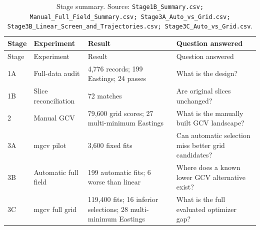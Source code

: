 \begin{longtable}{@{}p{1.2cm}p{3.1cm}p{4.2cm}p{5.8cm}@{}}
\caption{Stage summary. Source: \texttt{Stage1B\_Summary.csv; Manual\_Full\_Field\_Summary.csv; Stage3A\_Auto\_vs\_Grid.csv; Stage3B\_Linear\_Screen\_and\_Trajectories.csv; Stage3C\_Auto\_vs\_Grid.csv}.}\label{tab:stage-summary}\\
\toprule
Stage & Experiment & Result & Question answered\\
\midrule
\endfirsthead
\toprule
Stage & Experiment & Result & Question answered\\
\midrule
\endhead
1A & Full-data audit & 4,776 records; 199 Eastings; 24 passes & What is the design?\\
1B & Slice reconciliation & 72 matches & Are original slices unchanged?\\
2 & Manual GCV & 79,600 grid scores; 27 multi-minimum Eastings & What is the manually built GCV landscape?\\
3A & mgcv pilot & 3,600 fixed fits & Can automatic selection miss better grid candidates?\\
3B & Automatic full field & 199 automatic fits; 6 worse than linear & Where does a known lower GCV alternative exist?\\
3C & mgcv full grid & 119,400 fits; 16 inferior selections; 28 multi-minimum Eastings & What is the full evaluated optimizer gap?\\
\bottomrule
\end{longtable}
